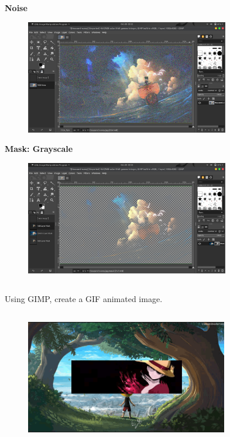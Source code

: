 \documentclass[9pt,letterpaper]{article}
\begin{document}
\textbf{Noise}\\
\begin{figure}[h]
    \centering
    \includegraphics[height=5cm]{Outputs/OP3.png}
\end{figure}
\newpage
\textbf{Mask: Grayscale}\\
\begin{figure}[h]
    \centering
    \includegraphics[height=5cm]{Outputs/OP4.png}
\end{figure}

\newpage

\subsection*{}
\begin{flushleft}
    Using GIMP, create a GIF animated image.
\end{flushleft}

\subsection*{}

\begin{figure}[h]
    \centering
    \includegraphics[height=5cm]{Outputs/OP-gif1.png}
\end{figure}
\end{document}
